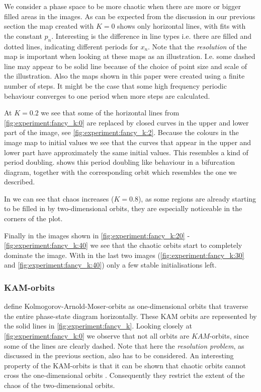 We consider a phase space to be more chaotic when there are more or bigger filled areas in the images. As can be expected from the discussion in our previous section the map created with $K = 0$ shows only horizontal lines, with fits with the constant $p_n$. Interesting is the difference in line types i.e. there are filled and dotted lines, indicating different periods for $x_n$. Note that the \textit{resolution} of the map is important when looking at these maps as an illustration. I.e. some dashed line may appear to be solid line because of the choice of point size and scale of the illustration. Also the maps shown in this paper were created using a finite number of steps. It might be the case that some high frequency periodic behaviour converges to one period when more steps are calculated.

At $K = 0.2$ we see that some of the horizontal lines from \cref{fig:experiment:fancy_k:0} are replaced by closed curves in the upper and lower part of the image, see \cref{fig:experiment:fancy_k:2}. Because the colours in the image map to initial values we see that the curves that appear in the upper and lower part have approximately the same initial values. This resembles a kind of period doubling.  shows this period doubling like behaviour in a bifurcation diagram, together with the corresponding orbit which resembles the one we described.

In  we can see that chaos increases ($K = 0.8$), as some regions are already starting to be filled in by two-dimensional orbits, they are especially noticeable in the corners of the plot.

 Finally in the images shown in \cref{fig:experiment:fancy_k:20} - \ref{fig:experiment:fancy_k:40} we see that the chaotic orbits start to completely dominate the image. With in the last two images (\cref{fig:experiment:fancy_k:30} and \ref{fig:experiment:fancy_k:40}) only a few stable initialisations left. 

\subsubsection{KAM-orbits}
\label{ss:b:kam}
\citeauthor{kenzel1997physics} define Kolmogorov-Arnold-Moser-orbits as one-dimensional orbits that traverse the entire phase-state diagram horizontally. These KAM orbits are represented by the solid lines in  \cref{fig:experiment:fancy_k}. Looking closely at \cref{fig:experiment:fancy_k:0} we observe that not all orbits are $KAM$-orbits, since some of the lines are clearly dashed. Note that here the \textit{resolution problem}, as discussed in the previous section, also has to be considered. An interesting property of the KAM-orbits is that it can be shown that chaotic orbits cannot cross the one-dimensional orbits \cite{kenzel1997physics}. Consequently they restrict the extent of the chaos of the two-dimensional orbits.\\

